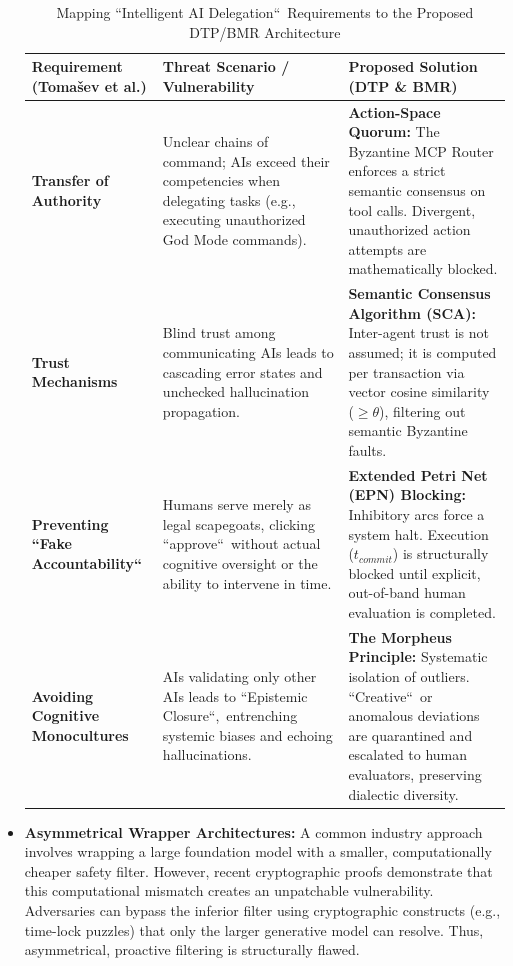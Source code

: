 \documentclass[a4paper,11pt,twocolumn]{article}
\theoremstyle{definition}
\theoremstyle{plain}
\begin{document}
\begin{itemize}
\begin{table}[ht]
\centering
\caption{Mapping “Intelligent AI Delegation“\ Requirements \cite{tomasev2026intelligent} to the Proposed DTP/BMR Architecture}
\label{tab:delegation_comparison}
\renewcommand{\arraystretch}{1.3}
\begin{tabularx}{\textwidth}{@{}p{4cm}XX@{}}
\toprule
\textbf{Requirement (Toma{\v{s}}ev et al.)} & \textbf{Threat Scenario / Vulnerability} & \textbf{Proposed Solution (DTP \& BMR)} \\ 
\midrule
\textbf{Transfer of Authority} & Unclear chains of command; AIs exceed their competencies when delegating tasks (e.g., executing unauthorized God Mode commands). & \textbf{Action-Space Quorum:} The Byzantine MCP Router enforces a strict semantic consensus on tool calls. Divergent, unauthorized action attempts are mathematically blocked. \\ 
\textbf{Trust Mechanisms} & Blind trust among communicating AIs leads to cascading error states and unchecked hallucination propagation. & \textbf{Semantic Consensus Algorithm (SCA):} Inter-agent trust is not assumed; it is computed per transaction via vector cosine similarity ($\ge \theta$), filtering out semantic Byzantine faults. \\ 
\textbf{Preventing “Fake Accountability“} & Humans serve merely as legal scapegoats, clicking “approve“\ without actual cognitive oversight or the ability to intervene in time. & \textbf{Extended Petri Net (EPN) Blocking:} Inhibitory arcs force a system halt. Execution ($t_{commit}$) is structurally blocked until explicit, out-of-band human evaluation is completed. \\ 
\textbf{Avoiding Cognitive Monocultures} & AIs validating only other AIs leads to “Epistemic Closure“,\ entrenching systemic biases and echoing hallucinations. & \textbf{The Morpheus Principle:} Systematic isolation of outliers. “Creative“\ or anomalous deviations are quarantined and escalated to human evaluators, preserving dialectic diversity. \\ 
\bottomrule
\end{tabularx}
\end{table}
    
    \item \textbf{Asymmetrical Wrapper Architectures:} A common industry approach involves wrapping a large foundation model with a smaller, computationally cheaper safety filter.
    However, recent cryptographic proofs \cite{goldwasser2025holes} demonstrate that this computational mismatch creates an unpatchable vulnerability. Adversaries can bypass the inferior filter using cryptographic constructs (e.g., time-lock puzzles) that only the larger generative model can resolve.
    Thus, asymmetrical, proactive filtering is structurally flawed.
\end{itemize}
\end{document}
